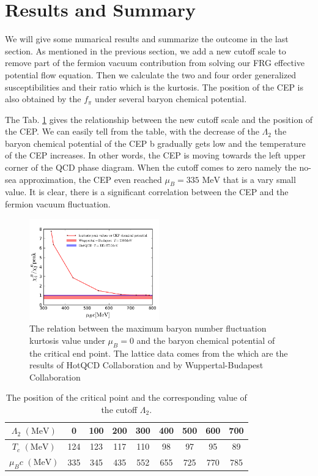 \documentclass[%
reprint,
superscriptaddress,
showpacs,preprintnumbers,
 amsmath,amssymb,
 aps,
prl,
]{revtex4-1}
\begin{document}
\section{Results and Summary}
\label{sec:res}
We will give some numarical results and summarize the outcome in the last section. As mentioned in the previous section, we add a new cutoff scale to remove part of the fermion vacuum contribution from solving our FRG effective potential flow equation. Then we calculate the two and four order generalized susceptibilities and their ratio which is the kurtosis. The position of the CEP is also obtained by the $f_\pi$ under several baryon chemical potential. \par The Tab. \ref{tab:cut} gives the relationship between the new cutoff scale and the position of the CEP. We can easily tell from the table, with the decrease of the $\Lambda_2$ the baryon chemical potential of the CEP  b gradually gets low and the temperature of the CEP increases. In other words, the CEP is moving towards the left upper corner of the QCD phase diagram. When the cutoff comes to zero namely the no-sea approximation, the CEP even reached $\mu_B=335\,\,\mathrm{MeV}$ that is a vary small value. It is clear, there is a significant correlation between the CEP and the fermion vacuum fluctuation.
%
\begin{figure}[t]
\includegraphics[width=0.5\textwidth]{cp}
\caption{The relation between the maximum baryon number fluctuation kurtosis value under $\mu_B=0$ and the baryon chemical potential of the critical end point. The lattice data comes from the \cite{Bazavov:2017dus,Bazavov:2017tot} which are the results of HotQCD Collaboration and \cite{Borsanyi:2013hza} by Wuppertal-Budapest Collaboration}\label{fig:cp}
\end{figure}
%
%
\begin{table}[t]
  \centering
  \begin{tabular}{c||c|c|c|c|c|c|c|c}
    \hline
    $\Lambda_2\,\,(\mathrm{MeV})$ & 0 & 100 & 200 & 300 & 400 & 500 & 600 & 700  \rule{0pt}{2.6ex}
\rule[-1.2ex]{0pt}{0pt}\\ \hline\hline
    $T_c\,\,(\mathrm{MeV})$ &124& 123 & 117 &110 &98&97&95&89 \\\hline
    $\mu_Bc\,\,(\mathrm{MeV})$ &335 &345 &435 &552&655&725&770&785\\\hline

  \end{tabular}
  \caption{The position of the critical point and the corresponding value of the cutoff $\Lambda_2$.} 
  \label{tab:cut}
\end{table}
%
\end{document}
